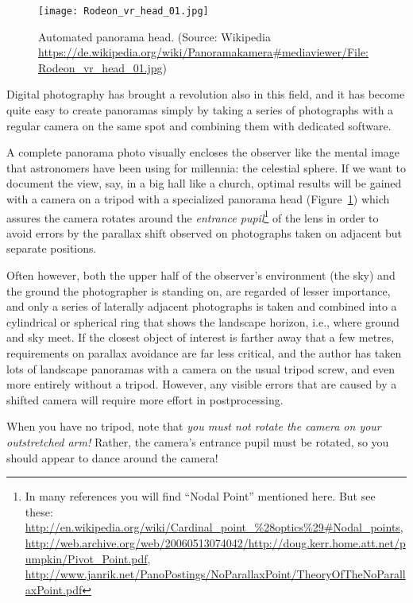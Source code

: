 \begin{figure}[tbp]
  \centering
  \texttt{[image: Rodeon\_vr\_head\_01.jpg]}
  \caption{Automated panorama head. \footnotesize{(Source: Wikipedia \url{https://de.wikipedia.org/wiki/Panoramakamera\#mediaviewer/File:Rodeon_vr_head_01.jpg})}}
  \label{fig:landscapes:panoHead}
\end{figure}


Digital photography has brought a revolution also in this field, and it has
become quite easy to create panoramas simply by taking a series of
photographs with a regular camera on the same spot and combining them
with dedicated software.

A complete panorama photo visually encloses the observer like the
mental image that astronomers have been using for millennia: the
celestial sphere. If we want to document the view, say, in a big hall
like a church, optimal results will be gained with a camera on a
tripod with a specialized panorama head (Figure~\ref{fig:landscapes:panoHead}) which assures the camera
rotates around the \emph{entrance pupil}\footnote{In many references
  you will find ``Nodal Point'' mentioned here. But see these:
  \url{http://en.wikipedia.org/wiki/Cardinal_point_\%28optics\%29\#Nodal_points},
  \url{http://web.archive.org/web/20060513074042/http://doug.kerr.home.att.net/pumpkin/Pivot_Point.pdf},
  \url{http://www.janrik.net/PanoPostings/NoParallaxPoint/TheoryOfTheNoParallaxPoint.pdf}
} of the lens in order to avoid errors by the parallax shift observed
on photographs taken on adjacent but separate positions.


Often however, both the upper half of the observer's environment (the
sky) and the ground the photographer is standing on, are regarded of
lesser importance, and only a series of laterally adjacent photographs
is taken and combined into a cylindrical or spherical ring that shows the landscape horizon, i.e.,  where ground and sky meet. If the
closest object of interest is farther away that a few metres,
requirements on parallax avoidance are far less critical, and the author
has taken lots of landscape panoramas with a camera on the usual
tripod screw, and even more entirely without a tripod. However, any visible errors
that are caused by a shifted camera will require more effort in
postprocessing.

When you have no tripod, note that \emph{you must not rotate the
  camera on your outstretched arm!} Rather, the camera's entrance
pupil must be rotated, so you should appear to dance around the
camera!

